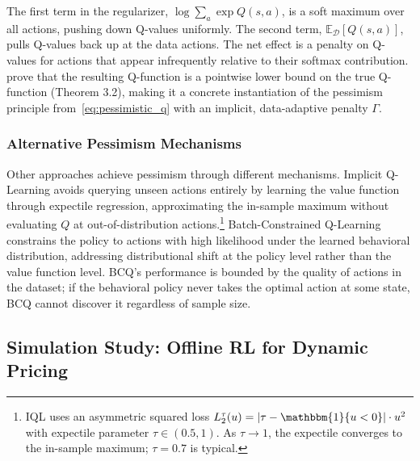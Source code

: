 The first term in the regularizer, $\log \sum_a \exp Q(s,a)$, is a soft maximum over all actions, pushing down Q-values uniformly. The second term, $\mathbb{E}_{\mathcal{D}}[Q(s,a)]$, pulls Q-values back up at the data actions. The net effect is a penalty on Q-values for actions that appear infrequently relative to their softmax contribution. \citet{Kumar2020} prove that the resulting Q-function is a pointwise lower bound on the true Q-function (Theorem 3.2), making it a concrete instantiation of the pessimism principle from~\eqref{eq:pessimistic_q} with an implicit, data-adaptive penalty $\Gamma$.

\subsubsection{Alternative Pessimism Mechanisms}

Other approaches achieve pessimism through different mechanisms. Implicit Q-Learning \citep[IQL,][]{Kostrikov2022} avoids querying unseen actions entirely by learning the value function through expectile regression, approximating the in-sample maximum without evaluating $Q$ at out-of-distribution actions.\footnote{IQL uses an asymmetric squared loss $L_2^\tau(u) = |\tau - \mathbbm{1}\{u < 0\}| \cdot u^2$ with expectile parameter $\tau \in (0.5, 1)$. As $\tau \to 1$, the expectile converges to the in-sample maximum; $\tau = 0.7$ is typical.} Batch-Constrained Q-Learning \citep[BCQ,][]{Fujimoto2019} constrains the policy to actions with high likelihood under the learned behavioral distribution, addressing distributional shift at the policy level rather than the value function level. BCQ's performance is bounded by the quality of actions in the dataset; if the behavioral policy never takes the optimal action at some state, BCQ cannot discover it regardless of sample size.

\subsection{Simulation Study: Offline RL for Dynamic Pricing}
\label{sec:offline_sim}


